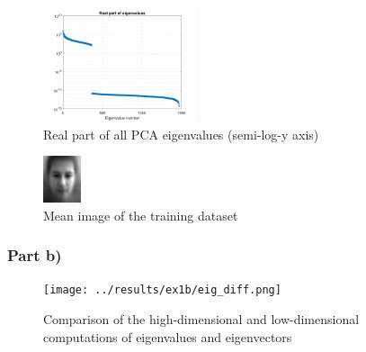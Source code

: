 \documentclass[10pt,technote]{IEEEtran}
\begin{document}
\begin{figure}
    \centering
    \includegraphics[width=0.4\textwidth]{../results/ex1a/eigenvalues.png}
    \caption{Real part of all PCA eigenvalues (semi-log-y axis)}
    \label{fig:eigvals1}
\end{figure}

\begin{figure}
    \centering
    \includegraphics[width=0.1\textwidth]{../results/ex1a/mean_image.png}
    \caption{Mean image of the training dataset}
    \label{fig:mean_im1}
\end{figure}

\subsubsection{Part b)}
\begin{figure}
    \centering
    \texttt{[image: ../results/ex1b/eig\_diff.png]}
    \caption{Comparison of the high-dimensional and low-dimensional computations of eigenvalues and eigenvectors}
    \label{fig:eig_diff1}
\end{figure}




%
%
\end{document}
